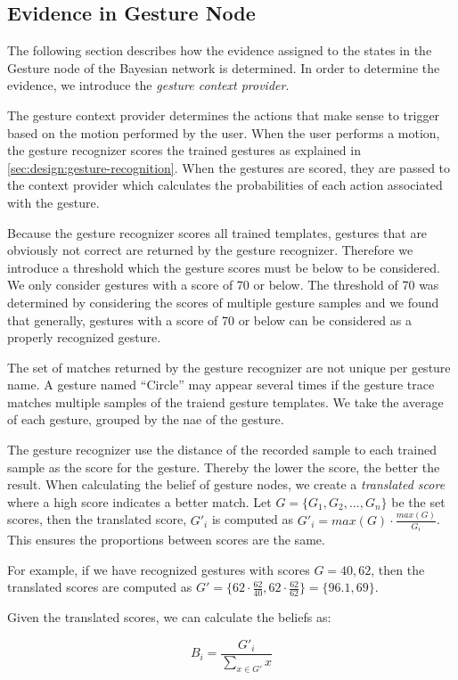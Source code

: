 \subsection{Evidence in Gesture Node}
\label{sec:design:bayesian-network:gesture-node-evidence}

The following section describes how the evidence assigned to the states in the Gesture node of the Bayesian network is determined. In order to determine the evidence, we introduce the \emph{gesture context provider}.

The gesture context provider determines the actions that make sense to trigger based on the motion performed by the user. When the user performs a motion, the gesture recognizer scores the trained gestures as explained in \cref{sec:design:gesture-recognition}. When the gestures are scored, they are passed to the context provider which calculates the probabilities of each action associated with the gesture. 

Because the gesture recognizer scores all trained templates, gestures that are obviously not correct are returned by the gesture recognizer. Therefore we introduce a threshold which the gesture scores must be below to be considered. We only consider gestures with a score of 70 or below. The threshold of 70 was determined by considering the scores of multiple gesture samples and we found that generally, gestures with a score of 70 or below can be considered as a properly recognized gesture.

The set of matches returned by the gesture recognizer are not unique per gesture name. A gesture named ``Circle'' may appear several times if the gesture trace matches multiple samples of the traiend gesture templates. We take the average of each gesture, grouped by the nae of the gesture.

The gesture recognizer use the distance of the recorded sample to each trained sample as the score for the gesture. Thereby the lower the score, the better the result. When calculating the belief of gesture nodes, we create a \emph{translated score} where a high score indicates a better match. Let $G = \{G_1, G_2, \ldots, G_n\}$ be the set scores, then the translated score, $G'_i$ is computed as $G'_i = max(G) \cdot \frac{max(G)}{G_i}$. This ensures the proportions between scores are the same.

For example, if we have recognized gestures with scores $G = {40, 62}$, then the translated scores are computed as $G' = \{ 62 \cdot \frac{62}{40}, 62 \cdot \frac{62}{62} \} = \{ 96.1, 69 \}$.

Given the translated scores, we can calculate the beliefs as:

\begin{equation*}
B_i = \frac{{G'}_{i}}{\sum\limits_{x \in G'} x}
\end{equation*}

